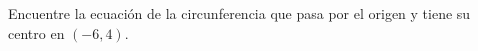 \item Encuentre la ecuación de la circunferencia que pasa por el origen y tiene su centro en $(-6, 4)$.
